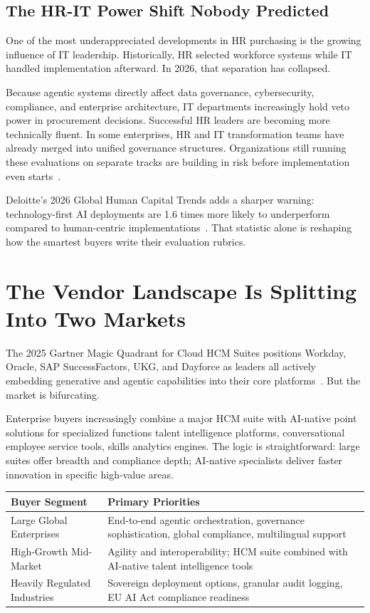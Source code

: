 \documentclass[12pt, a4paper]{article}
\begin{document}
\subsection*{The HR-IT Power Shift Nobody Predicted}

One of the most underappreciated developments in HR purchasing is the growing influence
of IT leadership. Historically, HR selected workforce systems while IT handled
implementation afterward. In 2026, that separation has collapsed.

Because agentic systems directly affect data governance, cybersecurity, compliance, and
enterprise architecture, IT departments increasingly hold veto power in procurement
decisions. Successful HR leaders are becoming more technically fluent. In some enterprises,
HR and IT transformation teams have already merged into unified governance structures.
Organizations still running these evaluations on separate tracks are building in risk
before implementation even starts~\cite{deloitte2026}.

Deloitte's 2026 Global Human Capital Trends adds a sharper warning: technology-first AI
deployments are 1.6 times more likely to underperform compared to human-centric
implementations~\cite{deloitte2026}. That statistic alone is reshaping how the smartest
buyers write their evaluation rubrics.

\section{The Vendor Landscape Is Splitting Into Two Markets}

The 2025 Gartner Magic Quadrant for Cloud HCM Suites positions Workday, Oracle,
SAP SuccessFactors, UKG, and Dayforce as leaders all actively embedding generative
and agentic capabilities into their core platforms~\cite{gartnerMQ2025}. But the market
is bifurcating.

Enterprise buyers increasingly combine a major HCM suite with AI-native point solutions
for specialized functions talent intelligence platforms, conversational employee service
tools, skills analytics engines. The logic is straightforward: large suites offer breadth
and compliance depth; AI-native specialists deliver faster innovation in specific
high-value areas.

\begin{center}
\begin{tabularx}{\linewidth}{p{3.8cm} X}
\toprule
\textbf{Buyer Segment} & \textbf{Primary Priorities} \\
\midrule
Large Global Enterprises &
End-to-end agentic orchestration, governance sophistication, global compliance, multilingual support \\[6pt]
High-Growth Mid-Market &
Agility and interoperability; HCM suite combined with AI-native talent intelligence tools \\[6pt]
Heavily Regulated Industries &
Sovereign deployment options, granular audit logging, EU AI Act compliance readiness \\
\bottomrule
\end{tabularx}
\end{center}
\end{document}
